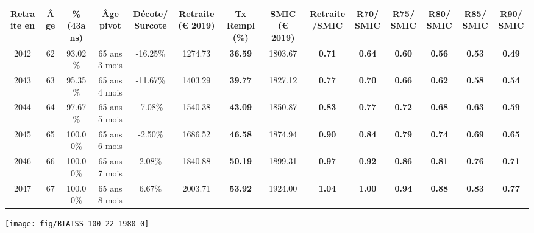 \begin{adjustbox}{max width=\textwidth} 
\begin{tabular}[htb]{|c|c||c|c|c||c|c||c|c||c|c|c|c|c|} 
\hline 
 Retraite en &  Âge &  \%(43ans) &  Âge pivot &  Décote/Surcote &  Retraite (\euro{} 2019) &  Tx Rempl(\%) &  SMIC (\euro{} 2019) &  Retraite/SMIC &  R70/SMIC &  R75/SMIC &  R80/SMIC &  R85/SMIC &  R90/SMIC \\ 
\hline \hline 
 2042 &  62 &  93.02\% &  65 ans 3 mois &  -16.25\% &  1274.73 &  {\bf 36.59} &  1803.67 &  {\bf {\color{red} 0.71}} &  {\bf {\color{red} 0.64}} &  {\bf {\color{red} 0.60}} &  {\bf {\color{red} 0.56}} &  {\bf {\color{red} 0.53}} &  {\bf {\color{red} 0.49}} \\ 
\hline 
 2043 &  63 &  95.35\% &  65 ans 4 mois &  -11.67\% &  1403.29 &  {\bf 39.77} &  1827.12 &  {\bf {\color{red} 0.77}} &  {\bf {\color{red} 0.70}} &  {\bf {\color{red} 0.66}} &  {\bf {\color{red} 0.62}} &  {\bf {\color{red} 0.58}} &  {\bf {\color{red} 0.54}} \\ 
\hline 
 2044 &  64 &  97.67\% &  65 ans 5 mois &  -7.08\% &  1540.38 &  {\bf 43.09} &  1850.87 &  {\bf {\color{red} 0.83}} &  {\bf {\color{red} 0.77}} &  {\bf {\color{red} 0.72}} &  {\bf {\color{red} 0.68}} &  {\bf {\color{red} 0.63}} &  {\bf {\color{red} 0.59}} \\ 
\hline 
 2045 &  65 &  100.00\% &  65 ans 6 mois &  -2.50\% &  1686.52 &  {\bf 46.58} &  1874.94 &  {\bf {\color{red} 0.90}} &  {\bf {\color{red} 0.84}} &  {\bf {\color{red} 0.79}} &  {\bf {\color{red} 0.74}} &  {\bf {\color{red} 0.69}} &  {\bf {\color{red} 0.65}} \\ 
\hline 
 2046 &  66 &  100.00\% &  65 ans 7 mois &  2.08\% &  1840.88 &  {\bf 50.19} &  1899.31 &  {\bf {\color{red} 0.97}} &  {\bf {\color{red} 0.92}} &  {\bf {\color{red} 0.86}} &  {\bf {\color{red} 0.81}} &  {\bf {\color{red} 0.76}} &  {\bf {\color{red} 0.71}} \\ 
\hline 
 2047 &  67 &  100.00\% &  65 ans 8 mois &  6.67\% &  2003.71 &  {\bf 53.92} &  1924.00 &  {\bf 1.04} &  {\bf 1.00} &  {\bf {\color{red} 0.94}} &  {\bf {\color{red} 0.88}} &  {\bf {\color{red} 0.83}} &  {\bf {\color{red} 0.77}} \\ 
\hline 
\hline 
\end{tabular} 
\end{adjustbox} 
 
 \vspace{0.1cm} 

 {\hspace{-2.2cm}\texttt{[image: fig/BIATSS\_100\_22\_1980\_0]}} 

